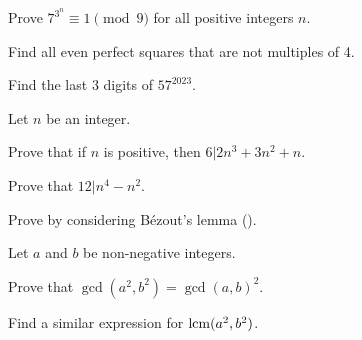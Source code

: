 \begin{problem}
    Prove $7^{3^n} \equiv 1 \pmod 9$ for all positive integers $n$.
\end{problem}

\begin{problem}
    Find all even perfect squares that are not multiples of 4.
\end{problem}

\begin{problem}
    Find the last 3 digits of $57^{2023}$.
\end{problem}

\begin{problem}
    Let $n$ be an integer.
    \begin{partquestions}{\roman*}
        \item Prove that if $n$ is positive, then $6 \vert 2n^3 + 3n^2 + n$.
        \item Prove that $12 \vert n^4 - n^2$.
    \end{partquestions}
\end{problem}

\begin{problem}\label{problem-n-divides-ab-and-n-coprime-with-a-implies-n-divides-b}
    Prove  by considering B\'ezout's lemma ().
\end{problem}

\begin{problem}
    Let $a$ and $b$ be non-negative integers.
    \begin{partquestions}{\roman*}
        \item Prove that $\gcd(a^2, b^2) = \gcd(a,b)^2$.
        \item Find a similar expression for $\mathrm{lcm}(a^2, b^2)$.
    \end{partquestions}
\end{problem}

